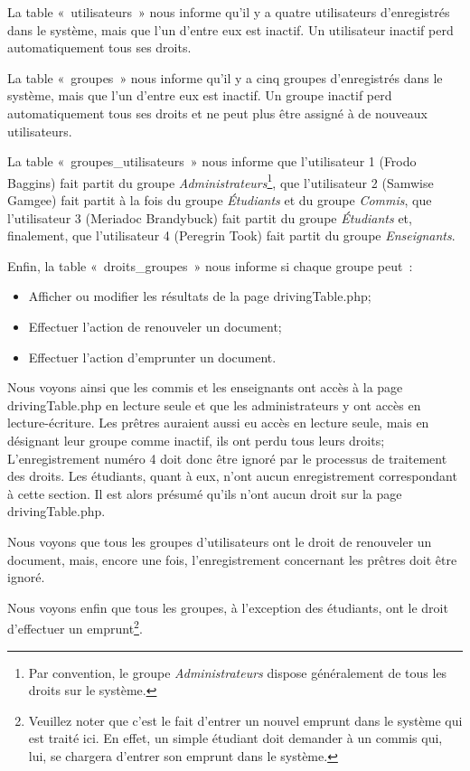 \documentclass[letter, 11pt]{report}
\begin{document}
La table «~utilisateurs~» nous informe qu'il y a quatre utilisateurs d'enregistrés dans le système, mais que l'un d'entre eux est inactif. Un utilisateur inactif perd automatiquement tous ses droits.

La table «~groupes~» nous informe qu'il y a cinq groupes d'enregistrés dans le système, mais que l'un d'entre eux est inactif. Un groupe inactif perd automatiquement tous ses droits et ne peut plus être assigné à de nouveaux utilisateurs.

La table «~groupes\_utilisateurs~» nous informe que l'utilisateur 1 (Frodo Baggins) fait partit du groupe \emph{Administrateurs}\footnote{Par convention, le groupe \emph{Administrateurs} dispose généralement de tous les droits sur le système.}, que l'utilisateur 2 (Samwise Gamgee) fait partit à la fois du groupe \emph{Étudiants} et du groupe \emph{Commis}, que l'utilisateur 3 (Meriadoc Brandybuck) fait partit du groupe \emph{Étudiants} et, finalement, que l'utilisateur 4 (Peregrin Took) fait partit du groupe \emph{Enseignants}.

Enfin, la table «~droits\_groupes~» nous informe si chaque groupe peut~:

\begin{itemize}
	\item Afficher ou modifier les résultats de la page drivingTable.php;
	\item Effectuer l'action de renouveler un document;
	\item Effectuer l'action d'emprunter un document.
\end{itemize}

Nous voyons ainsi que les commis et les enseignants ont accès à la page drivingTable.php en lecture seule et que les administrateurs y ont accès en lecture-écriture. Les prêtres auraient aussi eu accès en lecture seule, mais en désignant leur groupe comme inactif, ils ont perdu tous leurs droits; L'enregistrement numéro 4 doit donc être ignoré par le processus de traitement des droits. Les étudiants, quant à eux, n'ont aucun enregistrement correspondant à cette section. Il est alors présumé qu'ils n'ont aucun droit sur la page drivingTable.php.

Nous voyons que tous les groupes d'utilisateurs ont le droit de renouveler un document, mais, encore une fois, l'enregistrement concernant les prêtres doit être ignoré.

Nous voyons enfin que tous les groupes, à l'exception des étudiants, ont le droit d'effectuer un emprunt\footnote{Veuillez noter que c'est le fait d'entrer un nouvel emprunt dans le système qui est traité ici. En effet, un simple étudiant doit demander à un commis qui, lui, se chargera d'entrer son emprunt dans le système.}.
\end{document}
